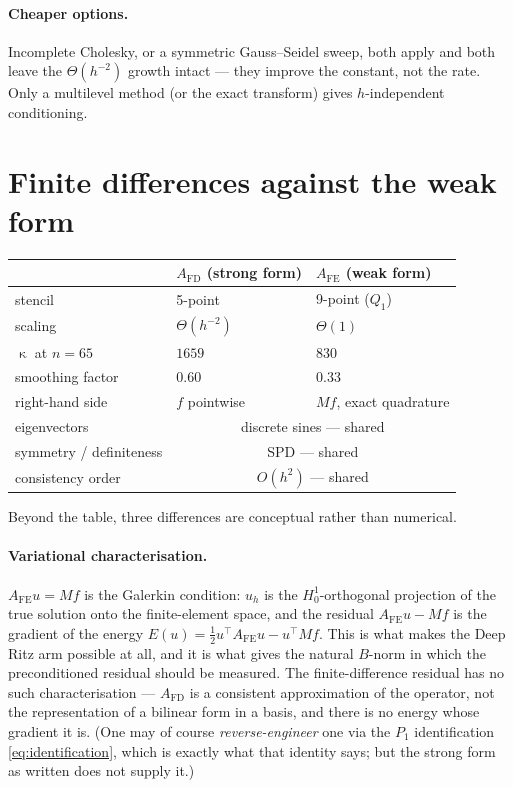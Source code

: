 \documentclass[11pt]{article}
\newcommand{\Afd}{A_{\mathrm{FD}}}
\newcommand{\Afe}{A_{\mathrm{FE}}}
\DeclareMathOperator{\cond}{\kappa}
\begin{document}
\paragraph{Cheaper options.} Incomplete Cholesky, or a symmetric Gauss--Seidel sweep, both apply
and both leave the $\Theta(h^{-2})$ growth intact --- they improve the constant, not the rate. Only
a multilevel method (or the exact transform) gives $h$-independent conditioning.

\section{Finite differences against the weak form}

\begin{center}
\begin{tabular}{lll}
\toprule
& $\Afd$ (strong form) & $\Afe$ (weak form) \\
\midrule
stencil            & 5-point            & 9-point ($Q_1$) \\
scaling            & $\Theta(h^{-2})$   & $\Theta(1)$ \\
$\cond$ at $n=65$  & $1659$             & $830$ \\
smoothing factor   & $0.60$             & $0.33$ \\
right-hand side    & $f$ pointwise      & $Mf$, exact quadrature \\
eigenvectors       & \multicolumn{2}{c}{discrete sines --- shared} \\
symmetry / definiteness & \multicolumn{2}{c}{SPD --- shared} \\
consistency order  & \multicolumn{2}{c}{$O(h^2)$ --- shared} \\
\bottomrule
\end{tabular}
\end{center}

Beyond the table, three differences are conceptual rather than numerical.

\paragraph{Variational characterisation.} $\Afe u = Mf$ is the Galerkin condition: $u_h$ is the
$H^1_0$-orthogonal projection of the true solution onto the finite-element space, and the residual
$\Afe u - Mf$ is the gradient of the energy
$E(u)=\tfrac12 u^\top \Afe u - u^\top M f$. This is what makes the Deep Ritz arm possible at all,
and it is what gives the natural $B$-norm in which the preconditioned residual should be measured.
The finite-difference residual has no such characterisation --- $\Afd$ is a consistent
approximation of the operator, not the representation of a bilinear form in a basis, and there is
no energy whose gradient it is. (One may of course \emph{reverse-engineer} one via the $P_1$
identification \eqref{eq:identification}, which is exactly what that identity says; but the strong
form as written does not supply it.)
\end{document}
